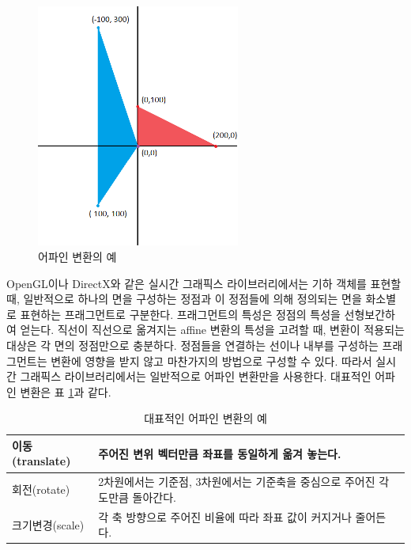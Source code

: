 \begin{figure}[h!]
  \centering
    \includegraphics[height=8cm]{OGL_transform/affineXform.png}
    \caption{어파인 변환의 예}
    \label{fig:OGL_transform:affineXform}
\end{figure}

OpenGL이나 DirectX와 같은 실시간 그래픽스 라이브러리에서는 기하 객체를 표현할 때, 일반적으로 하나의 면을 구성하는 정점과 이 정점들에 의해 정의되는 면을 화소별로 표현하는 프래그먼트로 구분한다. 프래그먼트의 특성은 정점의 특성을 선형보간하여 얻는다. 직선이 직선으로 옮겨지는 affine 변환의 특성을 고려할 때, 변환이 적용되는 대상은 각 면의 정점만으로 충분하다. 정점들을 연결하는 선이나 내부를 구성하는 프래그먼트는 변환에 영향을 받지 않고 마찬가지의 방법으로 구성할 수 있다. 따라서 실시간 그래픽스 라이브러리에서는 일반적으로 어파인 변환만을 사용한다. 대표적인 어파인 변환은 표 \ref{tab:transform:affineXforms}과 같다.

\begin{table}
\caption{대표적인 어파인 변환의 예}
\label{tab:transform:affineXforms}
\begin{center}
    \begin{tabular}{ |l| p{10cm} |}
    \hline
    {\small \sf 이동(translate)} & {\small \sf 주어진 변위 벡터만큼 좌표를 동일하게 옮겨 놓는다.} \\ \hline
    {\small \sf 회전(rotate)} & {\small \sf 2차원에서는 기준점, 3차원에서는 기준축을 중심으로 주어진 각도만큼 돌아간다.}\\ \hline
    {\small \sf 크기변경(scale)} & {\small \sf 각 축 방향으로 주어진 비율에 따라 좌표 값이 커지거나 줄어든다.}\\ \hline
    \hline
    \end{tabular}
\end{center}
\end{table}


